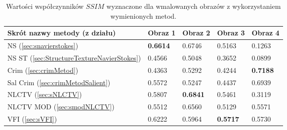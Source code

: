 \documentclass[a4paper,12pt,twoside,openany]{report}
\begin{document}
\begin{table}
\begin{center}
 \begin{tabular}{| p{5.7cm} || P{1.5cm} | P{1.5cm} | P{1.5cm} | P{1.5cm} |} 
 \hline
Skrót nazwy metody (z działu) & Obraz 1 & Obraz 2 & Obraz 3 & Obraz 4 \\ \hline \hline

NS (\ref{sec:snavierstokes}) &
\textbf{0.6614} & 0.6746 & 0.5163 & 0.1263 \\ \hline

NS ST (\ref{sec:StructureTextureNavierStokes}) &
0.4566 & 0.5048 & 0.3652 & 0.0899 \\ \hline

Crim (\ref{sec:crimMetod}) &
0.4363 & 0.5292 & 0.4244 & \textbf{0.7188} \\ \hline

Sal Crim (\ref{sec:crimMetodSalient}) &
0.5572 & 0.5247 & 0.4437 & 0.6939 \\ \hline

NLCTV (\ref{sec:sNLCTV}) &
0.5807 & \textbf{0.6841} & 0.5461 & 0.3119 \\ \hline

NLCTV MOD (\ref{sec:smodNLCTV}) &
0.5512 & 0.6560 & 0.5129 & 0.5571 \\ \hline

VFI (\ref{sec:sVFI}) &
0.6222 & 0.5964 & \textbf{0.5717} & 0.5730 \\ \hline

\end{tabular}
\caption{Wartości współczynników $SSIM$ wyznaczone dla wmalowanych obrazów z wykorzystaniem wymienionych metod.}
\label{TabCompare}
\end{center}
\end{table}
\end{document}
